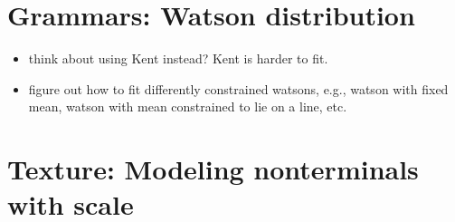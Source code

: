 \documentclass{book}
\begin{document}
\section{Grammars: Watson distribution}
\label{sec-6_12}

\begin{itemize}
\item think about using Kent instead? Kent is harder to fit.
\item figure out how to fit differently constrained watsons, e.g.,
    watson with fixed mean, watson with mean constrained to lie on a
    line, etc.
\end{itemize}
\section{Texture: Modeling nonterminals with scale}
\label{sec-6_13}
\end{document}
